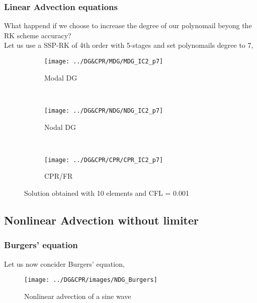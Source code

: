 \begin{frame} \frametitle{Linear Advection equations}
What happend if we choose to increase the degree of our polynomail beyong the RK scheme accuracy?\\
Let us use a SSP-RK of 4th order with 5-stages and set polynomails degree to 7,
	\begin{figure}
        \centering
        \begin{subfigure}[b]{0.31\textwidth}
                \centering
                \texttt{[image: ../DG\&CPR/MDG/MDG\_IC2\_p7]}
                \caption{Modal DG}
                \label{fig:MDG_IC2_p7_averages}
        \end{subfigure}%
				~
        \begin{subfigure}[b]{0.31\textwidth}
                \centering
                \texttt{[image: ../DG\&CPR/NDG/NDG\_IC2\_p7]}
                \caption{Nodal DG}
                \label{fig:NDG_IC2_p7_averages}
        \end{subfigure}
				~
        \begin{subfigure}[b]{0.31\textwidth}
								\centering
                \texttt{[image: ../DG\&CPR/CPR/CPR\_IC2\_p7]}
                \caption{CPR/FR}
                \label{fig:CPR_IC2_p7_averages}
        \end{subfigure}
				\caption{Solution obtained with 10 elements and CFL = 0.001}
				\label{fig:compareLinearAdvection_p7averages}
	\end{figure}
\end{frame}

\subsection{Nonlinear Advection without limiter}

\begin{frame} \frametitle{Burgers' equation}
	Let us now concider Burgers' equation,
	\begin{figure}
		\centering
		\texttt{[image: ../DG\&CPR/images/NDG\_Burgers]}
		\caption{Nonlinear advection of a sine wave}
		\label{fig:NonlinearAdvection}
	\end{figure}
\end{frame}

